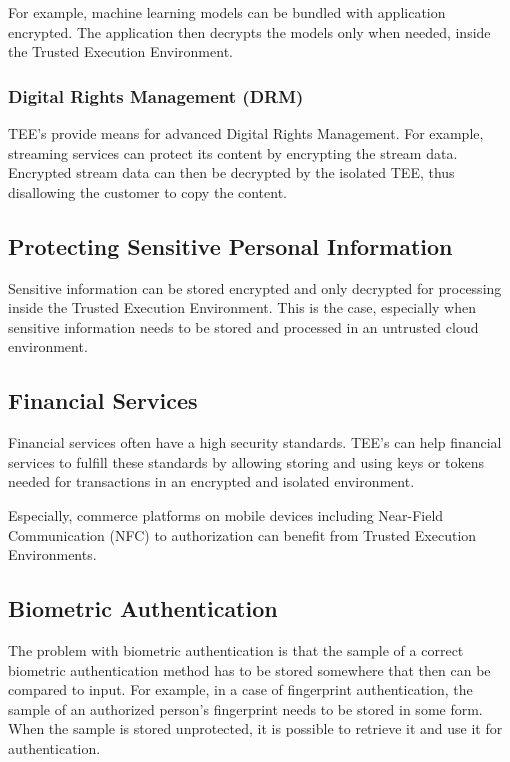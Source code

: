 For example, machine learning models can be bundled with application encrypted. The application then decrypts the models only when needed, inside the Trusted Execution Environment.

\subsubsection{Digital Rights Management (DRM)}\label{protecting11}

TEE's provide means for advanced Digital Rights Management. For example, streaming services can protect its content by encrypting the stream data. Encrypted stream data can then be decrypted by the isolated TEE, thus disallowing the customer to copy the content.

\subsection{Protecting Sensitive Personal Information}\label{protecting2}

Sensitive information can be stored encrypted and only decrypted for processing inside the Trusted Execution Environment. This is the case, especially when sensitive information needs to be stored and processed in an untrusted cloud environment.

\subsection{Financial Services}\label{protecting3}

Financial services often have a high security standards. TEE's can help financial services to fulfill these standards by allowing storing and using keys or tokens needed for transactions in an encrypted and isolated environment.

Especially, commerce platforms on mobile devices including Near-Field Communication (NFC) to authorization can benefit from Trusted Execution Environments.

\subsection{Biometric Authentication}\label{protecting4}

The problem with biometric authentication is that the sample of a correct biometric authentication method has to be stored somewhere that then can be compared to input. For example, in a case of fingerprint authentication, the sample of an authorized person's fingerprint needs to be stored in some form. When the sample is stored unprotected, it is possible to retrieve it and use it for authentication.

